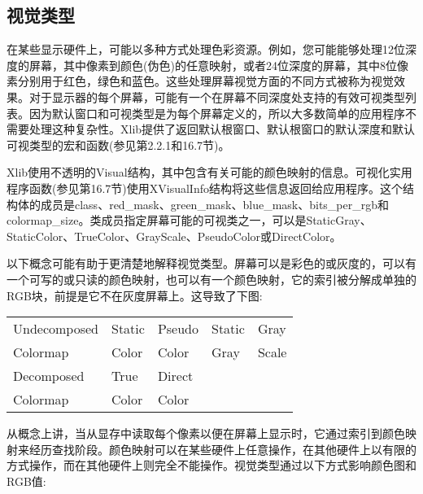 \subsection{视觉类型}

在某些显示硬件上，可能以多种方式处理色彩资源。例如，您可能能够处理12位深度的屏幕，其中像素到颜色(伪色)的任意映射，或者24位深度的屏幕，其中8位像素分别用于红色，绿色和蓝色。这些处理屏幕视觉方面的不同方式被称为视觉效果。对于显示器的每个屏幕，可能有一个在屏幕不同深度处支持的有效可视类型列表。因为默认窗口和可视类型是为每个屏幕定义的，所以大多数简单的应用程序不需要处理这种复杂性。Xlib提供了返回默认根窗口、默认根窗口的默认深度和默认可视类型的宏和函数(参见第2.2.1和16.7节)。

Xlib使用不透明的Visual结构，其中包含有关可能的颜色映射的信息。可视化实用程序函数(参见第16.7节)使用XVisualInfo结构将这些信息返回给应用程序。这个结构体的成员是class、red\_mask、green\_mask、blue\_mask、bits\_per\_rgb和colormap\_size。类成员指定屏幕可能的可视类之一，可以是StaticGray、StaticColor、TrueColor、GrayScale、PseudoColor或DirectColor。

以下概念可能有助于更清楚地解释视觉类型。屏幕可以是彩色的或灰度的，可以有一个可写的或只读的颜色映射，也可以有一个颜色映射，它的索引被分解成单独的RGB块，前提是它不在灰度屏幕上。这导致了下图:

\begin{center}
	\begin{supertabular}{|l|l|l|l|l|}
		Undecomposed & Static & Pseudo & Static & Gray\\
		Colormap & Color & Color & Gray & Scale\\
		Decomposed & True & Direct & & \\
		Colormap & Color & Color & & \\
		\hline
		
	\end{supertabular}
\end{center}

从概念上讲，当从显存中读取每个像素以便在屏幕上显示时，它通过索引到颜色映射来经历查找阶段。颜色映射可以在某些硬件上任意操作，在其他硬件上以有限的方式操作，而在其他硬件上则完全不能操作。视觉类型通过以下方式影响颜色图和RGB值:

